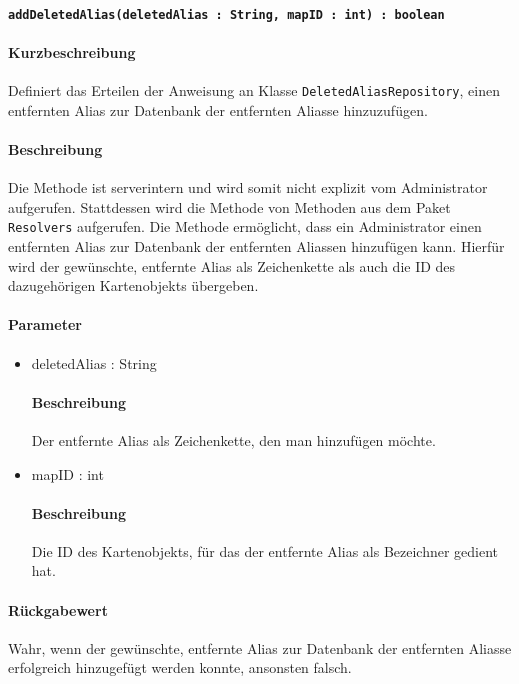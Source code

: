 \paragraph{\texttt{addDeletedAlias(deletedAlias : String, mapID : int) : boolean}}%
\paragraph*{Kurzbeschreibung}
Definiert das Erteilen der Anweisung an Klasse \texttt{DeletedAliasRepository}, einen entfernten Alias zur Datenbank der entfernten Aliasse hinzuzufügen.
\paragraph*{Beschreibung}
Die Methode ist serverintern und wird somit nicht explizit vom Administrator aufgerufen.
Stattdessen wird die Methode von Methoden aus dem Paket \texttt{Resolvers} aufgerufen.
Die Methode ermöglicht, dass ein Administrator einen entfernten Alias zur Datenbank der entfernten Aliassen hinzufügen kann.
Hierfür wird der gewünschte, entfernte Alias als Zeichenkette als auch die ID des dazugehörigen Kartenobjekts übergeben.
\paragraph*{Parameter}
\begin{itemize}
    \item deletedAlias : String
    		\paragraph*{Beschreibung}
    		Der entfernte Alias als Zeichenkette, den man hinzufügen möchte.
    \item mapID : int
    		\paragraph*{Beschreibung}
    		Die ID des Kartenobjekts, für das der entfernte Alias als Bezeichner gedient hat.
\end{itemize}
\paragraph*{Rückgabewert}
Wahr, wenn der gewünschte, entfernte Alias zur Datenbank der entfernten Aliasse erfolgreich hinzugefügt werden konnte, ansonsten falsch.
